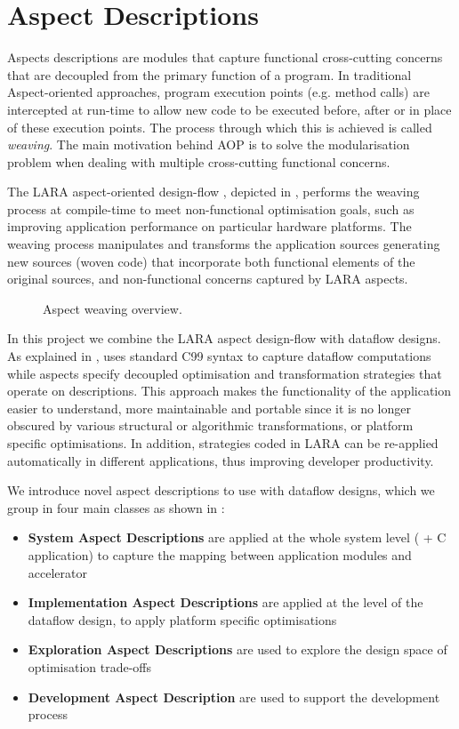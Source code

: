 \chapter{Aspect Descriptions}
\label{sec:aspects}

Aspects descriptions are modules that capture functional cross-cutting
concerns that are decoupled from the primary function of a program. In
traditional Aspect-oriented approaches, program execution points
(e.g. method calls) are intercepted at run-time to allow new code to
be executed before, after or in place of these execution points. The
process through which this is achieved is called \emph{weaving}. The
main motivation behind AOP is to solve the modularisation problem when
dealing with multiple cross-cutting functional concerns.

The LARA aspect-oriented design-flow
\cite{Cardoso:Carvalho:Cutinho:Luk:Nobre:Diniz:Petrov:2012}, depicted
in , performs the weaving process at
compile-time to meet non-functional optimisation goals, such as
improving application performance on particular hardware
platforms. The weaving process manipulates and transforms the
application sources generating new sources (woven code) that
incorporate both functional elements of the original sources, and
non-functional concerns captured by LARA aspects.

\begin{figure}[!ht]
  \centering
  \def\svgwidth{\textwidth}
  
  \caption{Aspect weaving overview.}
  \label{fig:aspect-weaving}
\end{figure}
In this project we combine the LARA aspect design-flow with \FAST{}
dataflow designs. As explained in , \FAST{} uses
standard C99 syntax to capture dataflow computations while aspects
specify decoupled optimisation and transformation strategies that
operate on \FAST{} descriptions. This approach makes the functionality
of the application easier to understand, more maintainable and
portable since it is no longer obscured by various structural or
algorithmic transformations, or platform specific optimisations. In
addition, strategies coded in LARA can be re-applied automatically in
different applications, thus improving developer productivity.

We introduce novel aspect descriptions to use with \FAST{} dataflow
designs, which we group in four main classes as shown in
:

\begin{itemize}
\item \textbf{System Aspect Descriptions} are applied at the whole
  system level (\FAST{} + C application) to capture the mapping
  between application modules and accelerator
\item \textbf{Implementation Aspect Descriptions} are applied at the
  level of the dataflow design, to apply platform specific
  optimisations
\item \textbf{Exploration Aspect Descriptions} are used to explore the
  design space of optimisation trade-offs
\item \textbf{Development Aspect Description} are used to support
    the development process
\end{itemize}

